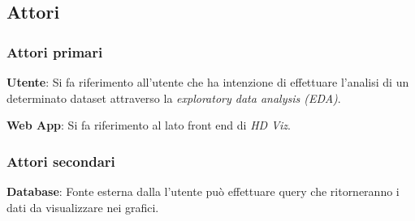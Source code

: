 \documentclass[../analisi_dei_requisiti.tex]{subfiles}
\begin{document}
%
\subsection{Attori}%
\label{subs:attori}

\subsubsection{Attori primari}%
\label{sssec:attori_primari}
\begin{description}
    \item \textbf{Utente}: Si fa riferimento all'utente che ha intenzione di effettuare l'analisi di un determinato dataset attraverso la \emph{exploratory data analysis (EDA)}.
    \item \textbf{Web App}: Si fa riferimento al lato front end di \emph{HD Viz}.
\end{description}

\subsubsection{Attori secondari}
\label{sssec:attori_secondari}
\begin{description}
    \item \textbf{Database}: Fonte esterna dalla l'utente può effettuare query che ritorneranno i dati da visualizzare nei grafici.
\end{description}


\newpage

\newpage

\newpage

\newpage

\newpage





\end{document}
